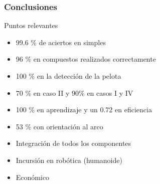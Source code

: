 \documentclass{beamer}
\begin{document}
\begin{frame}
\frametitle{Conclusiones}
 \begin{block}{Puntos relevantes}
  \begin{itemize}
\item 99.6 \% de aciertos en simples
\item 96 \% en compuestos realizados correctamente
\item 100 \% en la detecci\'on de la pelota
\item 70 \% en caso II y 90\% en casos I y IV
\item 100 \% en aprendizaje y un 0.72 en eficiencia
\item 53 \% con orientaci\'on al arco
\item Integraci\'on de todos los componentes
\item Incursi\'on en rob\'otica (humanoide)
\item Econ\'omico
  \end{itemize}

 \end{block}

\end{frame}
\end{document}
